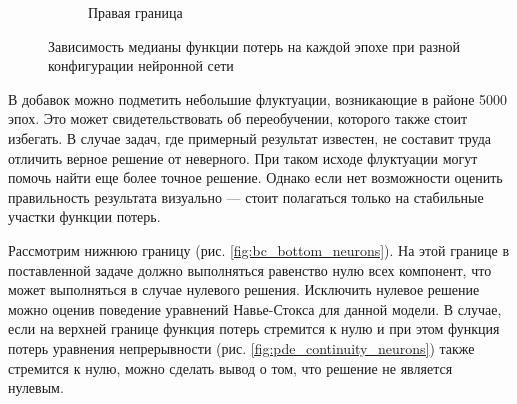 \begin{figure}[H]
\begin{subfigure}[b]{0.4\textwidth}
        \caption{Правая граница}
        \label{fig:bc_right_neurons}
    \end{subfigure}
    \caption{Зависимость медианы функции потерь на каждой эпохе при разной конфигурации нейронной сети}
    \label{fig:bc_loss_neurons}
\end{figure}

В добавок можно подметить небольшие флуктуации, возникающие в районе 5000 эпох. Это может свидетельствовать
об переобучении, которого также стоит избегать. В случае задач, где примерный результат известен, не составит
труда отличить верное решение от неверного. При таком исходе флуктуации могут помочь найти еще более
точное решение. Однако если нет возможности оценить правильность результата визуально --- стоит полагаться
только на стабильные участки функции потерь.

Рассмотрим нижнюю границу (рис. \ref{fig:bc_bottom_neurons}). На этой границе в поставленной задаче должно
выполняться равенство нулю всех компонент, что может выполняться в случае нулевого решения. Исключить 
нулевое решение можно оценив поведение уравнений Навье-Стокса для данной модели. В случае, если на верхней
границе функция потерь стремится к нулю и при этом функция потерь уравнения непрерывности (рис. \ref{fig:pde_continuity_neurons})
также стремится к нулю, можно сделать вывод о том, что решение не является нулевым.


